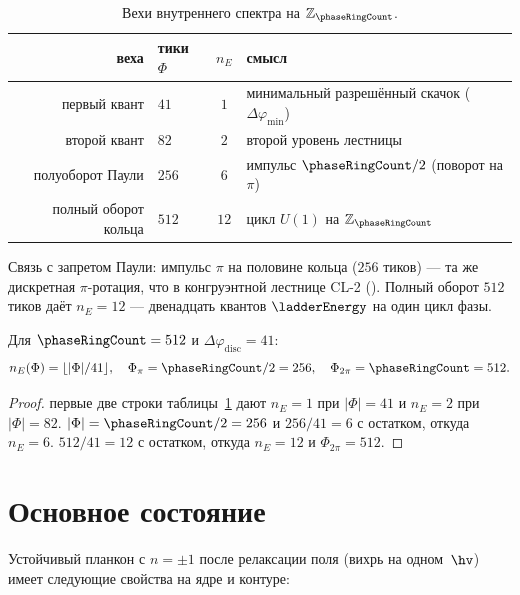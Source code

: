 \begin{table}[htbp]
  \centering
  \caption{Вехи внутреннего спектра на $\mathbb{Z}_{\phaseRingCount}$.}
  \label{tab:floor0-landmarks}
  \begin{tabular}{@{}rlcl@{}}
    \toprule
    веха & тики $\Phi$ & $n_E$ & смысл \\
    \midrule
    первый квант & $41$ & $1$ & минимальный разрешённый скачок ($\Delta\varphi_{\min}$) \\
    второй квант & $82$ & $2$ & второй уровень лестницы \\
    полуоборот Паули & $256$ & $6$ & импульс $\phaseRingCount/2$ (поворот на $\pi$) \\
    полный оборот кольца & $512$ & $12$ & цикл $U(1)$ на $\mathbb{Z}_{\phaseRingCount}$ \\
    \bottomrule
  \end{tabular}
\end{table}

Связь с запретом Паули: импульс $\pi$ на половине кольца ($256$ тиков) --- та же дискретная
$\pi$-ротация, что в конгруэнтной лестнице CL-2 ().
Полный оборот $512$ тиков даёт $n_E=12$ --- двенадцать квантов $\ladderEnergy$ на один цикл фазы.

\begin{proposition}[Лестница $n_E$]
\label{prop:floor0-ne-ladder}
Для $\phaseRingCount=512$ и $\Delta\varphi_{\mathrm{disc}}=41$:
\[
  n_E(\Phi) = \lfloor |\Phi| / 41\rfloor,\quad
  \Phi_{\pi} = \phaseRingCount/2 = 256,\quad
  \Phi_{2\pi} = \phaseRingCount = 512.
\]
\end{proposition}

\begin{proof}
первые две строки таблицы~\ref{tab:floor0-landmarks} дают $n_E=1$ при $|\Phi|=41$ и $n_E=2$ при $|\Phi|=82$.
$|\Phi|=\phaseRingCount/2=256$ и $256/41=6$ с остатком, откуда $n_E=6$.
$512/41=12$ с остатком, откуда $n_E=12$ и $\Phi_{2\pi}=512$.
\end{proof}

\section{Основное состояние}
\label{sec:floor0-ground}

Устойчивый планкон с $n=\pm1$ после релаксации поля (вихрь на одном~$\hv$)
имеет следующие свойства на ядре и контуре:

